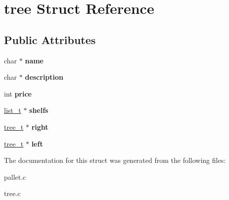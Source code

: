 \hypertarget{structtree}{}\section{tree Struct Reference}
\label{structtree}
\subsection*{Public Attributes}
\begin{DoxyCompactItemize}
\item 
\hypertarget{structtree_a7deafb819a37724cac1b28b493d09be0}{}char $\ast$ {\bfseries name}\label{structtree_a7deafb819a37724cac1b28b493d09be0}

\item 
\hypertarget{structtree_a215ddb804e20a04c88c2dc26800ca62e}{}char $\ast$ {\bfseries description}\label{structtree_a215ddb804e20a04c88c2dc26800ca62e}

\item 
\hypertarget{structtree_aa49d7986cd2fe757bf3ac7d676b68898}{}int {\bfseries price}\label{structtree_aa49d7986cd2fe757bf3ac7d676b68898}

\item 
\hypertarget{structtree_a1172d604255ea663191f4b02cbb3664e}{}\hyperlink{structlist}{list\+\_\+t} $\ast$ {\bfseries shelfs}\label{structtree_a1172d604255ea663191f4b02cbb3664e}

\item 
\hypertarget{structtree_a586ff19b47878daf544ce75834db7794}{}\hyperlink{structtree}{tree\+\_\+t} $\ast$ {\bfseries right}\label{structtree_a586ff19b47878daf544ce75834db7794}

\item 
\hypertarget{structtree_a05f4b308d6dc7ba6a28b573de49a449e}{}\hyperlink{structtree}{tree\+\_\+t} $\ast$ {\bfseries left}\label{structtree_a05f4b308d6dc7ba6a28b573de49a449e}

\end{DoxyCompactItemize}


The documentation for this struct was generated from the following files\+:\begin{DoxyCompactItemize}
\item 
pallet.\+c\item 
tree.\+c\end{DoxyCompactItemize}
